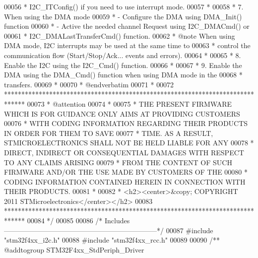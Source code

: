 \begin{DoxyCode}
00056 \textcolor{comment}{  *             I2C\_ITConfig() if you need to use interrupt mode. }
00057 \textcolor{comment}{  *}
00058 \textcolor{comment}{  *          7. When using the DMA mode }
00059 \textcolor{comment}{  *                   - Configure the DMA using DMA\_Init() function}
00060 \textcolor{comment}{  *                   - Active the needed channel Request using I2C\_DMACmd() or}
00061 \textcolor{comment}{  *                     I2C\_DMALastTransferCmd() function.}
00062 \textcolor{comment}{  *              @note When using DMA mode, I2C interrupts may be used at the same time to}
00063 \textcolor{comment}{  *                    control the communication flow (Start/Stop/Ack... events and errors).}
00064 \textcolor{comment}{  * }
00065 \textcolor{comment}{  *          8. Enable the I2C using the I2C\_Cmd() function.}
00066 \textcolor{comment}{  * }
00067 \textcolor{comment}{  *          9. Enable the DMA using the DMA\_Cmd() function when using DMA mode in the }
00068 \textcolor{comment}{  *             transfers. }
00069 \textcolor{comment}{  *}
00070 \textcolor{comment}{  *  @endverbatim}
00071 \textcolor{comment}{  *  }
00072 \textcolor{comment}{  ******************************************************************************}
00073 \textcolor{comment}{  * @attention}
00074 \textcolor{comment}{  *}
00075 \textcolor{comment}{  * THE PRESENT FIRMWARE WHICH IS FOR GUIDANCE ONLY AIMS AT PROVIDING CUSTOMERS}
00076 \textcolor{comment}{  * WITH CODING INFORMATION REGARDING THEIR PRODUCTS IN ORDER FOR THEM TO SAVE}
00077 \textcolor{comment}{  * TIME. AS A RESULT, STMICROELECTRONICS SHALL NOT BE HELD LIABLE FOR ANY}
00078 \textcolor{comment}{  * DIRECT, INDIRECT OR CONSEQUENTIAL DAMAGES WITH RESPECT TO ANY CLAIMS ARISING}
00079 \textcolor{comment}{  * FROM THE CONTENT OF SUCH FIRMWARE AND/OR THE USE MADE BY CUSTOMERS OF THE}
00080 \textcolor{comment}{  * CODING INFORMATION CONTAINED HEREIN IN CONNECTION WITH THEIR PRODUCTS.}
00081 \textcolor{comment}{  *}
00082 \textcolor{comment}{  * <h2><center>&copy; COPYRIGHT 2011 STMicroelectronics</center></h2>}
00083 \textcolor{comment}{  ******************************************************************************  }
00084 \textcolor{comment}{  */}
00085 
00086 \textcolor{comment}{/* Includes ------------------------------------------------------------------*/}
00087 \textcolor{preprocessor}{#}\textcolor{preprocessor}{include} "stm32f4xx_i2c.h"
00088 \textcolor{preprocessor}{#}\textcolor{preprocessor}{include} "stm32f4xx_rcc.h"
00089 
00090 \textcolor{comment}{/** @addtogroup STM32F4xx\_StdPeriph\_Driver}

\end{DoxyCode}
